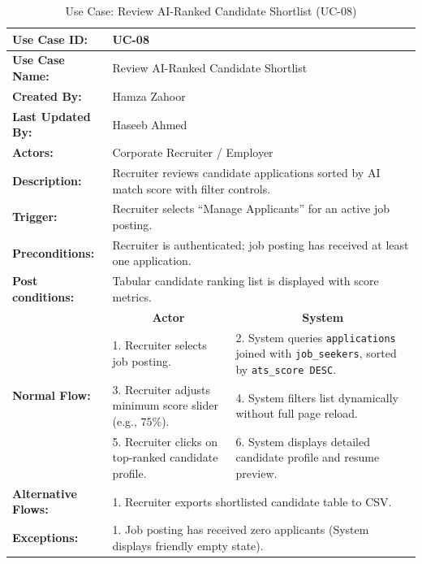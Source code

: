 \begin{table}[H]
\centering
\small
\caption{Use Case: Review AI-Ranked Candidate Shortlist (UC-08)}
\label{tab:uc08_spec}
\begin{tabular}{|p{3.2cm}|p{5.5cm}|p{5.5cm}|}
\hline
\textbf{Use Case ID:} & \multicolumn{2}{p{11.4cm}|}{UC-08} \\ \hline
\textbf{Use Case Name:} & \multicolumn{2}{p{11.4cm}|}{Review AI-Ranked Candidate Shortlist} \\ \hline
\textbf{Created By:} & \multicolumn{2}{p{11.4cm}|}{Hamza Zahoor} \\ \hline
\textbf{Last Updated By:} & \multicolumn{2}{p{11.4cm}|}{Haseeb Ahmed} \\ \hline
\textbf{Actors:} & \multicolumn{2}{p{11.4cm}|}{Corporate Recruiter / Employer} \\ \hline
\textbf{Description:} & \multicolumn{2}{p{11.4cm}|}{Recruiter reviews candidate applications sorted by AI match score with filter controls.} \\ \hline
\textbf{Trigger:} & \multicolumn{2}{p{11.4cm}|}{Recruiter selects ``Manage Applicants'' for an active job posting.} \\ \hline
\textbf{Preconditions:} & \multicolumn{2}{p{11.4cm}|}{Recruiter is authenticated; job posting has received at least one application.} \\ \hline
\textbf{Post conditions:} & \multicolumn{2}{p{11.4cm}|}{Tabular candidate ranking list is displayed with score metrics.} \\ \hline
\multirow{4}{*}{\textbf{Normal Flow:}} & \multicolumn{1}{c|}{\textbf{Actor}} & \multicolumn{1}{c|}{\textbf{System}} \\ \cline{2-3}
& 1. Recruiter selects job posting. & 2. System queries \texttt{applications} joined with \texttt{job\_seekers}, sorted by \texttt{ats\_score DESC}. \vspace{2pt} \\
& 3. Recruiter adjusts minimum score slider (e.g., $75\%$). & 4. System filters list dynamically without full page reload. \vspace{2pt} \\
& 5. Recruiter clicks on top-ranked candidate profile. & 6. System displays detailed candidate profile and resume preview. \\ \hline
\textbf{Alternative Flows:} & \multicolumn{2}{p{11.4cm}|}{1. Recruiter exports shortlisted candidate table to CSV.} \\ \hline
\textbf{Exceptions:} & \multicolumn{2}{p{11.4cm}|}{1. Job posting has received zero applicants (System displays friendly empty state).} \\ \hline
\end{tabular}
\end{table}

